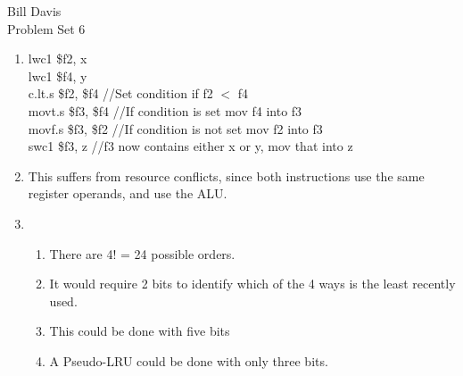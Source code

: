 \documentclass[11pt,fleqn]{article}
\begin{document}
\newcommand{\mbf}[1]{\mbox{{\bfseries #1}}}
\newcommand{\N}{\mbf{N}}
\renewcommand{\O}{\mbf{O}}

\noindent Bill Davis \\
 Problem Set 6

\begin{enumerate}
\item %
lwc1 \$f2, x  \\
lwc1 \$f4, y  \\
c.lt.s \$f2, \$f4 //Set condition if f2 $<$ f4 \\
movt.s \$f3, \$f4 //If condition is set mov f4 into f3\\ 
movf.s \$f3, \$f2 //If condition is not set mov f2 into f3\\
swc1 \$f3, z //f3 now contains either x or y, mov that into z\\


\item %
This suffers from resource conflicts, since both instructions use the same register operands, and use the ALU. 
\item %
  \begin{enumerate}
  \item There are 4! = 24 possible orders. 
  \item It would require 2 bits to identify which of the 4 ways is the least recently used.
  \item This could be done with five bits
  \item A Pseudo-LRU could be done with only three bits. 


\end{enumerate}
\end{enumerate}
\end{document}

